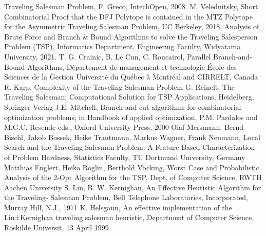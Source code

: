 \documentclass[a4paper,12pt]{report}
\begin{document}
\begin{thebibliography}{00}
Traveling Salesman Problem, F. Greco, IntechOpen, 2008.
M. Velednitsky, Short Combinatorial Proof that the DFJ Polytope is contained in
the MTZ Polytope for the Asymmetric Traveling Salesman Problem, UC Berkeley, 2018.
%
Analysis of Brute Force and Branch \& Bound Algorithms to solve the Traveling
Salesperson Problem (TSP), Informatics Department, Engineering Faculty, Widyatama University, 2021.
%
T. G. Crainic, B. Le Cun, C. Roucairol, Parallel Branch-and-Bound Algorithms, Département de management et technologie École des Sciences de la Gestion Université du Québec à Montréal and CIRRELT, Canada
%
R. Karp, Complexity of the Traveling Salesman Problem
%
G. Reinelt, The Traveling Salesman: Computational Solution for TSP Applications, Heidelberg, Springer-Verlag
J.E. Mitchell, Branch-and-cut algorithms for combinatorial
optimization problems, in Handbook of applied optimization, P.M.
Pardalos and M.G.C. Resende eds., Oxford University Press, 2000
Olaf Mersmann, Bernd Bischl, Jakob Bossek, Heike Trautmann, Markus Wagner, Frank Neumann, Local Search and the Traveling Salesman Problem: A Feature-Based Characterization of Problem Hardness, Statistics Faculty, TU Dortmund University, Germany
Matthias Englert, Heiko Röglin, Berthold Vöcking, Worst Case and Probabilistic Analysis 
of the 2-Opt Algorithm for the TSP, Dept. of Computer Science, RWTH Aachen University
S. Lin, B. W. Kernighan, An Effective Heuristic Algorithm for the Traveling-
Salesman Problem, Bell Telephone Laboratories, Incorporated, Murray Hill, N.J., 1971
K. Helsgaun, An effective implementation of the Lin±Kernighan traveling
salesman heuristic, Department of Computer Science, Roskilde Universit, 13 April 1999

\end{thebibliography}
% 
\end{document}
